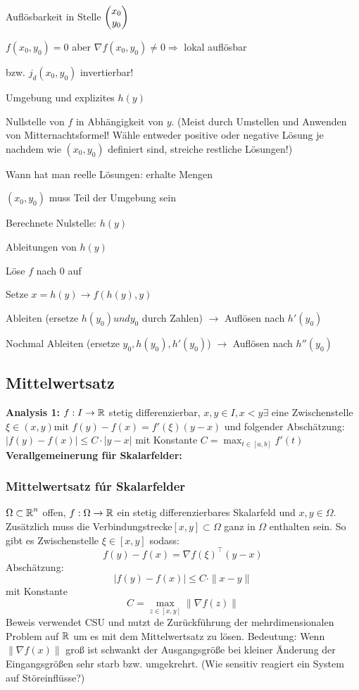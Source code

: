\documentclass[german]{latex4ei/latex4ei_sheet}
\begin{document}
\begin{cookbox}{Aufl\"osbarkeit in Stelle $\begin{pmatrix} x_0 \\ y_0 \end{pmatrix}$}
\item $f(x_0,y_0)=0$ aber $\nabla f(x_0,y_0)\neq 0 \Rightarrow$ lokal aufl\"osbar\\
\item bzw. $j_d(x_0,y_0)$ invertierbar!
\end{cookbox}

\begin{cookbox}{Umgebung und explizites $h(y)$}
\item  Nullstelle von $f$ in Abh\"angigkeit von $y$. (Meist durch Umstellen und Anwenden von Mitternachtsformel! W\"ahle entweder positive oder negative L\"osung je nachdem wie $(x_0,y_0)$ definiert sind, streiche restliche L\"osungen!)
\item Wann hat man reelle L\"osungen: erhalte Mengen
\item $(x_0,y_0)$ muss Teil der Umgebung sein
\item Berechnete Nulstelle: $h(y)$
\end{cookbox}

\begin{cookbox}{Ableitungen von $h(y)$}
\item  L\"ose $f$ nach $0$ auf
\item  Setze $x=h(y) \rightarrow f(h(y),y)$
\item Ableiten (ersetze $h(y_0) und y_0$ durch Zahlen) $\rightarrow$ Aufl\"osen nach $h'(y_0)$
\item Nochmal Ableiten (ersetze $y_0,h(y_0),h'(y_0)$) $\rightarrow$ Aufl\"osen nach $h''(y_0)$
\end{cookbox}
\subsection{Mittelwertsatz}
\textbf{Analysis 1:} $f:I\to\operatorname{\mathbb R}$ stetig differenzierbar, $x,y \in I, x < y \exists $ eine Zwischenstelle $\xi \in (x,y)$mit $f(y)-f(x)=f'(\xi)(y-x)$ und folgender Absch\"atzung: $|f(y)-f(x)|\le C \cdot |y-x|$ mit Konstante $C=\max_{t \in [a,b]}f'(t)$\\
\textbf{Verallgemeinerung f\"ur Skalarfelder:}

\subsubsection{Mittelwertsatz f\'ur Skalarfelder}
$\Omega \subset \operatorname{\mathbb R}^n$ offen, $f: \Omega \to \operatorname{\mathbb R}$ ein stetig differenzierbares Skalarfeld und $x,y \in \Omega$. Zus\"atzlich muss die Verbindungstrecke$[x,y]\subset\Omega$ ganz in $\Omega$ enthalten sein. So gibt es Zwischenstelle $\xi \in [x,y]$ sodass: \[f(y)-f(x)=\nabla f(\xi)^\top (y-x)\] Absch\"atzung: \[|f(y)-f(x)|\le C \cdot \|x-y\|\] mit Konstante \[C=\max_{z\in[x,y]} \|\nabla f(z)\|\]
Beweis verwendet CSU und nutzt de Zur\"uckf\"uhrung der mehrdimensionalen Problem auf $\operatorname{\mathbb R}$ um es mit dem Mittelwertsatz zu l\"osen.
Bedeutung: Wenn $\|\nabla f(x)\|$ gro\ss{} ist schwankt der Ausgangsgr\"o\ss{}e bei kleiner \"Anderung der Eingangsgr\"o\ss{}en sehr starb bzw. umgekrehrt. (Wie sensitiv reagiert ein System auf St\"oreinfl\"usse?)
\end{document}
